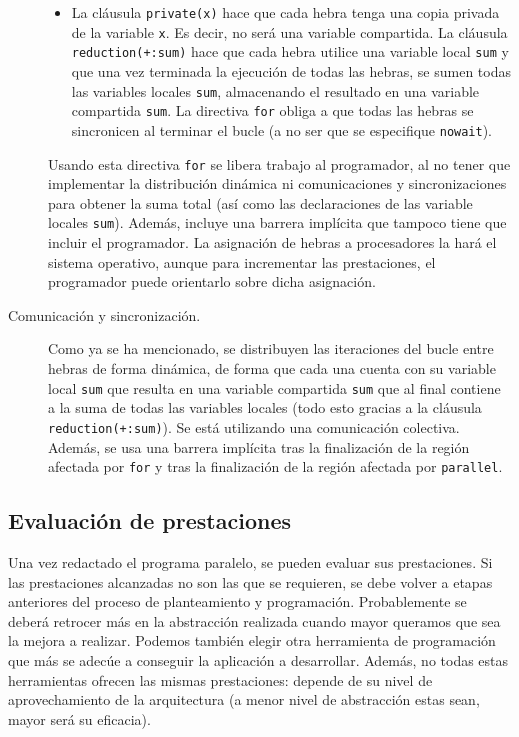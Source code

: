 \begin{description}
\begin{itemize}
            \item La cláusula \verb|private(x)| hace que cada hebra tenga una copia privada de la variable \verb|x|. Es decir, no será una variable compartida. La cláusula \verb|reduction(+:sum)| hace que cada hebra utilice una variable local \verb|sum| y que una vez terminada la ejecución de todas las hebras, se sumen todas las variables locales \verb|sum|, almacenando el resultado en una variable compartida \verb|sum|. La directiva \verb|for| obliga a que todas las hebras se sincronicen al terminar el bucle (a no ser que se especifique \verb|nowait|).
        \end{itemize}
        Usando esta directiva \verb|for| se libera trabajo al programador, al no tener que implementar la distribución dinámica ni comunicaciones y sincronizaciones para obtener la suma total (así como las declaraciones de las variable locales \verb|sum|). Además, incluye una barrera implícita que tampoco tiene que incluir el programador. La asignación de hebras a procesadores la hará el sistema operativo, aunque para incrementar las prestaciones, el programador puede orientarlo sobre dicha asignación.
    \item [Comunicación y sincronización.] 
        Como ya se ha mencionado, se distribuyen las iteraciones del bucle entre hebras de forma dinámica, de forma que cada una cuenta con su variable local \verb|sum| que resulta en una variable compartida \verb|sum| que al final contiene a la suma de todas las variables locales (todo esto gracias a la cláusula \verb|reduction(+:sum)|). Se está utilizando una comunicación colectiva. Además, se usa una barrera implícita tras la finalización de la región afectada por \verb|for| y tras la finalización de la región afectada por \verb|parallel|.
\end{description}

\subsection{Evaluación de prestaciones}
Una vez redactado el programa paralelo, se pueden evaluar sus prestaciones. Si las prestaciones alcanzadas no son las que se requieren, se debe volver a etapas anteriores del proceso de planteamiento y programación. Probablemente se deberá retrocer más en la abstracción realizada cuando mayor queramos que sea la mejora a realizar. Podemos también elegir otra herramienta de programación que más se adecúe a conseguir la aplicación a desarrollar. Además, no todas estas herramientas ofrecen las mismas prestaciones: depende de su nivel de aprovechamiento de la arquitectura (a menor nivel de abstracción estas sean, mayor será su eficacia).

